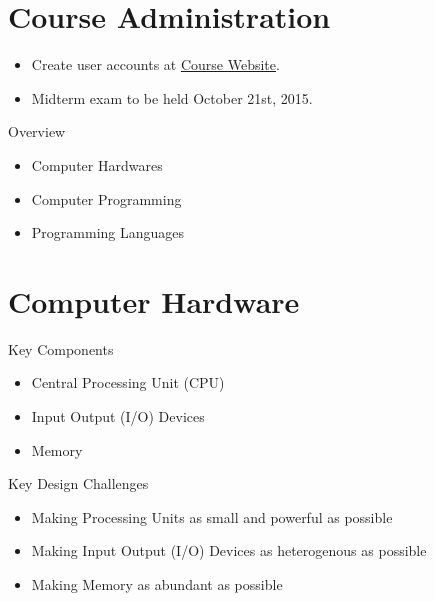 \documentclass[10pt, compress]{beamer}
\begin{document}
\prepareCover

\section{Course Administration}

\begin{slide}
	\begin{itemize}
		\item[] Create user accounts at \href{http://www.ghorbanzade.com}{Course Website}.
		\item[] Midterm exam to be held October 21st, 2015.
	\end{itemize}
\end{slide}

\begin{slide}
	\begin{block}{Overview}
		\begin{itemize}
			\item[] Computer Hardwares
			\item[] Computer Programming
			\item[] Programming Languages
		\end{itemize}
	\end{block}
\end{slide}

\section{Computer Hardware}

\begin{slide}
	\begin{block}{Key Components}
		\begin{itemize}
			\item[] Central Processing Unit (CPU)
			\item[] Input Output (I/O) Devices
			\item[] Memory
		\end{itemize}
	\end{block}
\end{slide}

\begin{slide}
	\begin{block}{Key Design Challenges}
		\begin{itemize}
			\item[] Making Processing Units as small and powerful as possible
			\item[] Making Input Output (I/O) Devices as heterogenous as possible
			\item[] Making Memory as abundant as possible
		\end{itemize}
	\end{block}
\end{slide}
\end{document}
